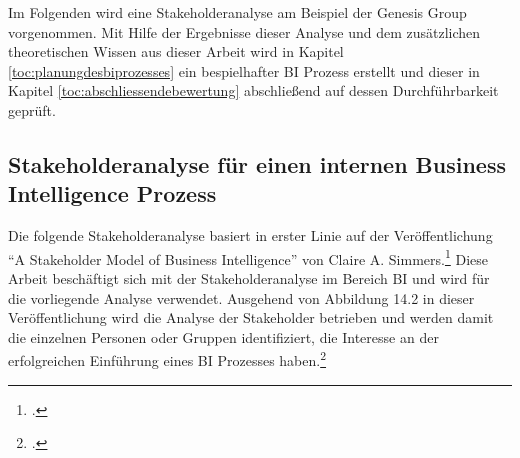 Im Folgenden wird eine Stakeholderanalyse am Beispiel der Genesis Group vorgenommen. Mit Hilfe der Ergebnisse dieser Analyse und dem zusätzlichen
theoretischen Wissen aus dieser Arbeit wird in Kapitel \ref{toc:planungdesbiprozesses} ein bespielhafter \ac{BI} Prozess erstellt und dieser
in Kapitel \ref{toc:abschliessendebewertung} abschließend auf dessen Durchführbarkeit geprüft.

\subsection{Stakeholderanalyse für einen internen Business Intelligence Prozess} \label{toc:stakeholderanalyse}

Die folgende Stakeholderanalyse basiert in erster Linie auf der Veröffentlichung "`A Stakeholder Model of Business
Intelligence"' von Claire A. Simmers.\footcite[Vgl.][]{simmers2004stakeholder} Diese Arbeit beschäftigt sich mit
der Stakeholderanalyse im Bereich \ac{BI} und wird für die vorliegende Analyse verwendet. Ausgehend von
Abbildung 14.2 in dieser Veröffentlichung wird die Analyse der Stakeholder betrieben und werden damit die einzelnen Personen oder Gruppen identifiziert,
die Interesse an der erfolgreichen Einführung eines \ac{BI} Prozesses haben.\footcite[Vgl.][Abb. 14.2]{simmers2004stakeholder}

